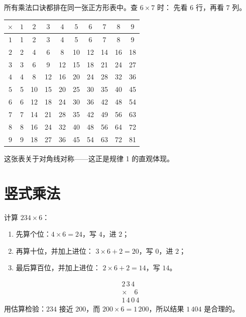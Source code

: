 \begin{example}[乘法表]\label{ex:g3:mult:table}
所有乘法口诀都排在同一张正方形表中。查 $6 \times 7$ 时：
先看 $6$ 行，再看 $7$ 列。
\begin{center}
\renewcommand{\arraystretch}{1.15}
\begin{tabular}{c|ccccccccc}
$\times$ & $1$ & $2$ & $3$ & $4$ & $5$ & $6$ & $7$ & $8$ & $9$ \\
\hline
$1$ & 1 & 2 & 3 & 4 & 5 & 6 & 7 & 8 & 9 \\
$2$ & 2 & 4 & 6 & 8 & 10 & 12 & 14 & 16 & 18 \\
$3$ & 3 & 6 & 9 & 12 & 15 & 18 & 21 & 24 & 27 \\
$4$ & 4 & 8 & 12 & 16 & 20 & 24 & 28 & 32 & 36 \\
$5$ & 5 & 10 & 15 & 20 & 25 & 30 & 35 & 40 & 45 \\
$6$ & 6 & 12 & 18 & 24 & 30 & 36 & 42 & 48 & 54 \\
$7$ & 7 & 14 & 21 & 28 & 35 & 42 & 49 & 56 & 63 \\
$8$ & 8 & 16 & 24 & 32 & 40 & 48 & 56 & 64 & 72 \\
$9$ & 9 & 18 & 27 & 36 & 45 & 54 & 63 & 72 & 81 \\
\end{tabular}
\end{center}
这张表关于对角线对称——这正是规律 1
的直观体现。
\end{example}

\section{竖式乘法}

\begin{method}[乘以一位数]\label{met:g3:mult:column}
计算 $234 \times 6$：
\begin{enumerate}
  \item 先算个位：$4 \times 6 = 24$，写 $4$，进 $2$；
  \item 再算十位，并加上进位：
        $3 \times 6 + 2 = 20$，写 $0$，进 $2$；
  \item 最后算百位，并加上进位：
        $2 \times 6 + 2 = 14$，写 $14$。
\end{enumerate}
\[
\begin{array}{r}
2\,3\,4 \\
\times \quad 6 \\
\hline
1\,4\,0\,4
\end{array}
\]
用估算检验：$234$ 接近 $200$，而
$200 \times 6 = 1\,200$，所以结果 $1\,404$ 是合理的。
\end{method}


